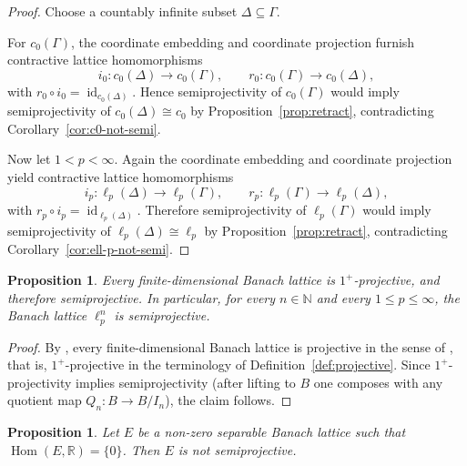 \documentclass[11pt]{amsart}
\renewcommand{\le}{\leqslant}
\numberwithin{equation}{section}
\newtheorem{proposition}[theorem]{Proposition}
\theoremstyle{definition}
\theoremstyle{remark}
\theoremstyle{plain}
\DeclareMathOperator{\Hom}{Hom}
\DeclareMathOperator{\id}{id}
\begin{document}
\begin{proof}
Choose a countably infinite subset \(\Delta\subseteq\Gamma\).

For \(c_0(\Gamma)\), the coordinate embedding and coordinate projection furnish contractive
lattice homomorphisms
\[
i_0\colon c_0(\Delta)\to c_0(\Gamma), \qquad
r_0\colon c_0(\Gamma)\to c_0(\Delta),
\]
with \(r_0\circ i_0=\id_{c_0(\Delta)}\).
Hence semiprojectivity of \(c_0(\Gamma)\) would imply semiprojectivity of
\(c_0(\Delta)\cong c_0\) by Proposition~\ref{prop:retract}, contradicting
Corollary~\ref{cor:c0-not-semi}.

Now let \(1<p<\infty\). Again the coordinate embedding and coordinate projection yield
contractive lattice homomorphisms
\[
i_p\colon \ell_p(\Delta)\to \ell_p(\Gamma), \qquad
r_p\colon \ell_p(\Gamma)\to \ell_p(\Delta),
\]
with \(r_p\circ i_p=\id_{\ell_p(\Delta)}\).
Therefore semiprojectivity of \(\ell_p(\Gamma)\) would imply semiprojectivity of
\(\ell_p(\Delta)\cong \ell_p\) by Proposition~\ref{prop:retract}, contradicting
Corollary~\ref{cor:ell-p-not-semi}.
\end{proof}

\begin{proposition}\label{prop:finite-dim}
Every finite-dimensional Banach lattice is $1^+$-projective, and therefore semiprojective.
In particular, for every $n\in\mathbb N$ and every $1\le p\le \infty$,
the Banach lattice $\ell_p^n$ is semiprojective.
\end{proposition}

\begin{proof}
By \cite[Theorem~11.1]{dpw}, every finite-dimensional Banach lattice is projective
in the sense of \cite{dpw}, that is, $1^+$-projective in the terminology of
Definition~\ref{def:projective}.
Since $1^+$-projectivity implies semiprojectivity
(after lifting to $B$ one composes with any quotient map $Q_n\colon B\to B/I_n$),
the claim follows.
\end{proof}

\begin{proposition}\label{prop:hom-zero-obstruction}
Let \(E\) be a non-zero separable Banach lattice such that
\(\Hom(E,\mathbb R)=\{0\}\).
Then \(E\) is not semiprojective.
\end{proposition}
\end{document}
